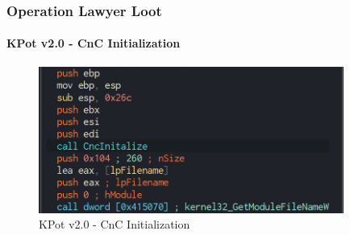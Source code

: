 \documentclass[aspectratio=169]{beamer}
\begin{document}
{
\begin{frame}
  \frametitle{Operation Lawyer Loot}
  \framesubtitle{KPot v2.0 - CnC Initialization}
  \begin{figure}
    \includegraphics[width=10cm]{kpot-cnc-init}
    \caption{KPot v2.0 - CnC Initialization}
  \end{figure}
\end{frame}
}
\end{document}
